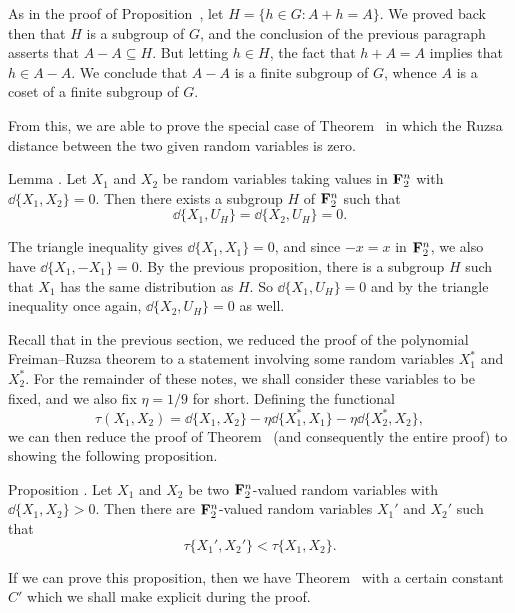 As in the proof
of Proposition~{\propdoublingone}, let $H = \{h\in G : A+h = A\}$. We proved back then that $H$ is a subgroup
of $G$, and the conclusion of the previous paragraph
asserts that $A-A \subseteq H$. But letting $h\in H$, the fact that
$h+A = A$ implies that $h\in A-A$. We conclude that
$A-A$ is a finite subgroup of $G$, whence $A$ is a coset of a finite subgroup of $G$.\slug

From this, we are able to prove the special case of Theorem~{\thmsubgroup} in which the Ruzsa distance between
the two given random variables is zero.

\edef\lemzerosubgroup{\the\sectcount.\the\thmcount}
\proclaim Lemma \advthm. Let $X_1$ and $X_2$ be random variables taking values in ${\bf F}_2^n$ with
$\dd\{X_1,X_2\} = 0$. Then there exists a subgroup $H$ of ${\bf F}_2^n$ such that
$$\dd\{X_1, U_H\} = \dd\{X_2,U_H\} = 0.$$

\proof The triangle inequality gives $\dd\{X_1,X_1\} = 0$, and since $-x = x$ in ${\bf F}_2^n$,
we also have $\dd\{X_1, - X_1\} = 0$. By the previous proposition, there is a subgroup $H$ such that
$X_1$ has the same distribution as $H$. So $\dd\{X_1, U_H\} = 0$ and by the triangle inequality once again,
$\dd\{X_2, U_H\} = 0$ as well.\slug

Recall that in the previous section, we reduced the proof of the polynomial Freiman--Ruzsa theorem
to a statement involving some random variables $X_1^*$ and $X_2^*$. For the remainder of these notes,
we shall consider these variables to be fixed, and we also fix $\eta = 1/9$ for short.
Defining the functional
$$\tau(X_1, X_2) = \dd\{X_1, X_2\} - \eta\dd\{X_1^*, X_1\} - \eta\dd\{X_2^*, X_2\},$$
we can then reduce the proof of Theorem~{\thmsubgroup} (and consequently the entire proof) to showing the
following proposition.

\edef\propmaintau{\the\sectcount.\the\thmcount}
\proclaim Proposition \advthm. Let $X_1$ and $X_2$ be two ${\bf F}_2^n$-valued random variables with
$\dd\{ X_1, X_2\} > 0$. Then there are ${\bf F}_2^n$-valued random variables $X_1'$ and $X_2'$ such that
$$\tau\{X_1', X_2'\} < \tau\{X_1, X_2\}.$$

If we can prove this proposition, then we have Theorem~{\thmsubgroup} with a certain constant $C'$ which
we shall make explicit during the proof.

